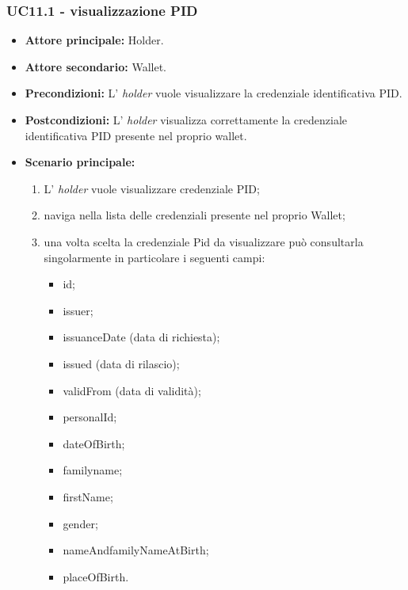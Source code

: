 \subsubsection{UC11.1 - visualizzazione PID}
\begin{itemize}
\item \textbf{Attore principale:} Holder.
\item \textbf{Attore secondario:} Wallet. 
\item \textbf{Precondizioni:} L’ \textit{holder} vuole visualizzare la credenziale identificativa PID.
\item \textbf{Postcondizioni:} L’ \textit{holder} visualizza correttamente la credenziale identificativa PID presente nel proprio wallet.
\item \textbf{Scenario principale:} 
    \begin{enumerate}
        \item L' \textit{holder} vuole visualizzare credenziale PID; 
        \item naviga nella lista delle credenziali presente nel proprio Wallet;
        \item una volta scelta la credenziale Pid da visualizzare può consultarla singolarmente in particolare i seguenti campi:
        \begin{itemize}
            \item id;
            \item issuer;
            \item issuanceDate (data di richiesta);
            \item issued (data di rilascio);
            \item validFrom (data di validità);
            \item personalId;
            \item dateOfBirth;
            \item familyname;
            \item firstName;
            \item gender;
            \item nameAndfamilyNameAtBirth;
            \item placeOfBirth.
        \end{itemize}
    \end{enumerate}
\end{itemize}

